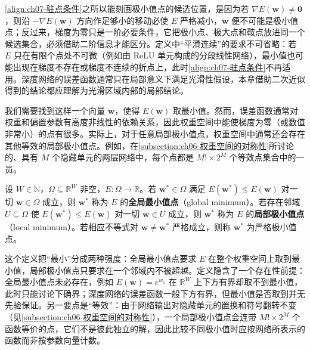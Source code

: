 \documentclass[../../main.tex]{subfiles}
\begin{document}
\begin{remark}
\eqref{align:ch07-驻点条件}之所以能刻画极小值点的候选位置，是因为若 $\nabla E(\mathbf{w})\neq\mathbf{0}$，则沿 $-\nabla E(\mathbf{w})$ 方向作足够小的移动必使 $E$ 严格减小，$\mathbf{w}$ 便不可能是极小值点；反过来，梯度为零只是一阶必要条件，它把极小点、极大点和鞍点放进同一个候选集合，必须借助二阶信息才能区分。定义中“平滑连续”的要求不可省略：若 $E$ 只在有限个点处不可微（例如由 ReLU 单元构成的分段线性网络），最小值也可能出现在梯度不存在或梯度不连续的折点上，此时\eqref{align:ch07-驻点条件}不再适用。深度网络的误差函数通常只在局部意义下满足光滑性假设，本章借助二次近似得到的结论都应理解为光滑区域内部的局部结论。
\end{remark}

我们需要找到这样一个向量 $\mathbf{w}$，使得 $E(\mathbf{w})$ 取最小值。然而，误差函数通常对权重和偏置参数有高度非线性的依赖关系，因此权重空间中能使梯度为零（或数值非常小）的点有很多。实际上，对于任意局部极小值点，权重空间中通常还会存在其他等效的局部极小值点。例如，在\cref{subsection:ch06-权重空间的对称性}所讨论的、具有 $M$ 个隐藏单元的两层网络中，每个点都是 $M!\times 2^{M}$ 个等效点集合中的一员。

\begin{definition}[全局最小值点与局部极小值点]\label{definition:ch07-全局与局部极小}
设 $W\in\mathbb{N}$，$\Omega\subseteq\mathbb{R}^{W}$ 非空，$E:\Omega\to\mathbb{R}$。若 $\mathbf{w}^{\ast}\in\Omega$ 满足 $E(\mathbf{w}^{\ast})\leqslant E(\mathbf{w})$ 对一切 $\mathbf{w}\in\Omega$ 成立，则 $\mathbf{w}^{\ast}$ 称为 $E$ 的\textbf{全局最小值点}（global minimum）。若存在邻域 $U\subseteq\Omega$ 使 $E(\mathbf{w}^{\ast})\leqslant E(\mathbf{w})$ 对一切 $\mathbf{w}\in U$ 成立，则 $\mathbf{w}^{\ast}$ 称为 $E$ 的\textbf{局部极小值点}（local minimum）。若相应不等式对 $\mathbf{w}\neq\mathbf{w}^{\ast}$ 严格成立，则称 $\mathbf{w}^{\ast}$ 为严格极小值点。
\end{definition}

\begin{remark}
这个定义把“最小”分成两种强度：全局最小值点要求 $E$ 在整个权重空间上取到最小值，局部极小值点只要求在一个邻域内不被超越。定义隐含了一个存在性前提：全局最小值点未必存在，例如 $E(\mathbf{w})=e^{w_1}$ 在 $\mathbb{R}^{W}$ 上下方有界却取不到最小值，此时只能讨论下确界；深度网络的误差函数一般下方有界，但最小值是否取到并无先验保证。另一要点是“等效”：由于网络输出对隐藏单元的置换和符号翻转不变（见\cref{subsection:ch06-权重空间的对称性}），一个局部极小值点会连带 $M!\times 2^{M}$ 个函数等价的点，它们不是彼此独立的解，因此比较不同极小值时应按网络所表示的函数而非按参数向量计数。
\end{remark}
\end{document}
